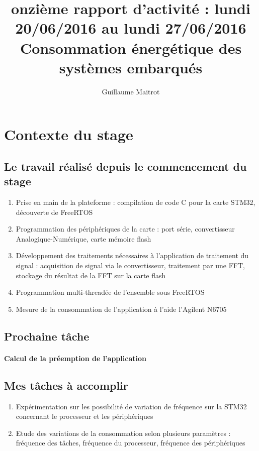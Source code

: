 \documentclass[a4paper]{article}
\title{onzième rapport d'activité : lundi 20/06/2016 au lundi 27/06/2016 }
\author{Guillaume Maitrot}
\begin{document}
\maketitle

\begin{center}
\centering
\title{Consommation énergétique des systèmes embarqués}
\end{center}

\section{Contexte du stage}

 \subsection{Le travail réalisé depuis le commencement du stage}
 \begin{enumerate}
\item {Prise en main de la plateforme : compilation de code C pour la carte STM32, découverte de FreeRTOS}
\item {Programmation des périphériques de la carte : port série,
convertisseur Analogique-Numérique, carte mémoire flash}
\item {Développement des traitements nécessaires à l'application de
traitement du signal : acquisition de signal via le convertisseur,
traitement par une FFT, stockage du résultat de la FFT sur la carte
flash}
\item { Programmation multi-threadée de l'ensemble sous FreeRTOS}
\item {Mesure de la consommation de l'application à l'aide l'Agilent
N6705}
\end{enumerate}

 \subsection{Prochaine tâche}
    \paragraph{Calcul de la préemption de l'application}
    
\subsection{Mes tâches à accomplir}
\begin{enumerate}
\item {Expérimentation sur les possibilité de variation de fréquence sur la
STM32 concernant le processeur et les périphériques}
\item {Etude des variations de la consommation selon plusieurs paramètres :
fréquence des tâches, fréquence du processeur, fréquence des
périphériques}
\end{enumerate}
\end{document}
